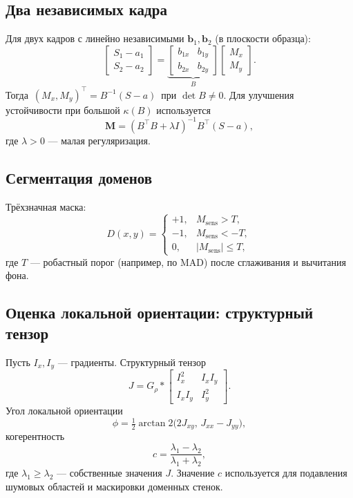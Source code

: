\documentclass[12pt,a4paper]{article}
\numberwithin{equation}{section}
\begin{document}
\subsection{Два независимых кадра}
Для двух кадров с линейно независимыми \(\mathbf b_1,\mathbf b_2\) (в плоскости образца):
\begin{equation}
 \begin{bmatrix} S_1-a_1\\ S_2-a_2 \end{bmatrix}
 =
 \underbrace{\begin{bmatrix} b_{1x} & b_{1y}\\ b_{2x} & b_{2y}\end{bmatrix}}_{B}
 \begin{bmatrix} M_x\\ M_y \end{bmatrix}.
\end{equation}
Тогда \(\,(M_x,M_y)^\top = B^{-1}(S-a)\,\) при \(\det B\neq 0\). Для улучшения устойчивости при большой \(\kappa(B)\) используется
\begin{equation}
 \mathbf M = (B^\top B + \lambda I)^{-1}B^\top (S-a),
\end{equation}
где \(\lambda>0\) — малая регуляризация.

\subsection{Сегментация доменов}
Трёхзначная маска:
\begin{equation}
 D(x,y)=
 \begin{cases}
 +1, & M_{\text{sens}} > T,\\
 -1, & M_{\text{sens}} < -T,\\
 0, & |M_{\text{sens}}|\le T,
 \end{cases}
\end{equation}
где \(T\) — робастный порог (например, по MAD) после сглаживания и вычитания фона.

\subsection{Оценка локальной ориентации: структурный тензор}
Пусть \(I_x,I_y\) — градиенты. Структурный тензор
\begin{equation}
 J = G_\rho * 
 \begin{bmatrix}
 I_x^2 & I_x I_y\\
 I_x I_y & I_y^2
 \end{bmatrix}.
\end{equation}
Угол локальной ориентации
\begin{equation}
 \phi = \tfrac12 \arctan2\!\big(2J_{xy},\, J_{xx}-J_{yy}\big),
\end{equation}
когерентность 
\begin{equation}
 c=\frac{\lambda_1-\lambda_2}{\lambda_1+\lambda_2},
\end{equation}
где \(\lambda_1\ge\lambda_2\) — собственные значения \(J\). Значение \(c\) используется для подавления шумовых областей и маскировки доменных стенок.
\end{document}
